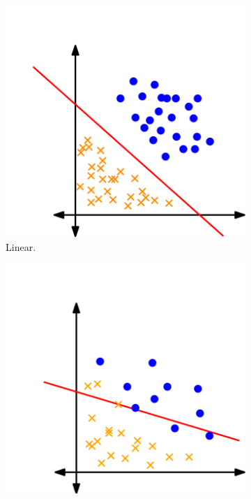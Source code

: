 \documentclass[12pt,a4paper]{scrartcl}
\theoremstyle{definition}%
\begin{document}
\begin{figure}[!ht] 
\centering
\begin{subfigure}[h]{0.3\textwidth}
\centering
\includegraphics[width=\textwidth]{hiperplano_SVM_linear}
\caption{Linear. \label{fig:classificacao_dados:hiperplano_SVM_linear}}
\end{subfigure}
\begin{subfigure}[!ht]{0.3\textwidth}
	\centering
	\includegraphics[width=\textwidth]{hiperplano_SVM_flexivel}

\end{subfigure}
\end{figure}
\end{document}
